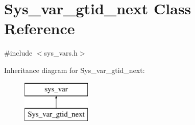 \hypertarget{classSys__var__gtid__next}{}\section{Sys\+\_\+var\+\_\+gtid\+\_\+next Class Reference}
\label{classSys__var__gtid__next}


{\ttfamily \#include $<$sys\+\_\+vars.\+h$>$}

Inheritance diagram for Sys\+\_\+var\+\_\+gtid\+\_\+next\+:\begin{figure}[H]
\begin{center}
\leavevmode
\includegraphics[height=2.000000cm]{classSys__var__gtid__next}
\end{center}
\end{figure}
